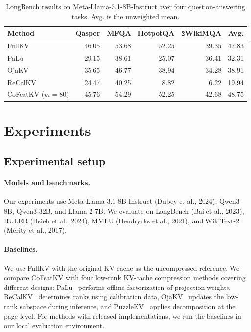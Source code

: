 \documentclass{article} %
\begin{document}
\begin{table}[H]
\centering
\caption{LongBench results on Meta-Llama-3.1-8B-Instruct over four question-answering
tasks. Avg. is the unweighted mean. }
\label{tab:longbench-llama}
\small
\setlength{\tabcolsep}{3.5pt}
\begin{tabular}{lrrrrr}
\toprule
Method & Qasper & MFQA & HotpotQA & 2WikiMQA & Avg. \\
\midrule
FullKV & 46.05 & 53.68 & 52.25 & 39.35 & 47.83 \\
PaLu~\citep{palu} & 29.15 & 38.61 & 25.07 & 36.41 & 32.31 \\
OjaKV~\citep{ojakv} & 35.65 & 46.77 & 38.94 & 34.28 & 38.91 \\
ReCalKV~\citep{recalkv} & 24.47 & 40.25 & 8.82 & 6.22 & 19.94 \\
CoFeatKV ($m=80$) &45.76 & 54.29 & 52.25 & 42.68 & 48.75 \\
\bottomrule
\end{tabular}
\end{table}
\section{Experiments}
\label{sec:experiments}

\subsection{Experimental setup}

\paragraph{Models and benchmarks.}
Our experiments use Meta-Llama-3.1-8B-Instruct (Dubey et al., 2024),
Qwen3-8B, Qwen3-32B, and Llama-2-7B. We evaluate on LongBench
(Bai et al., 2023), RULER (Hsieh et al., 2024), MMLU (Hendrycks et al.,
2021), and WikiText-2 (Merity et al., 2017).

\paragraph{Baselines.}
We use FullKV with the original KV cache as the uncompressed reference.
We compare CoFeatKV with four low-rank KV-cache compression methods covering
different designs: PaLu~\citep{palu} performs offline factorization
of projection weights, ReCalKV~\citep{recalkv} determines ranks using
calibration data, OjaKV~\citep{ojakv} updates the low-rank subspace
during inference, and PuzzleKV~\citep{puzzlekv} applies decomposition
at the page level. For methods with released implementations, we run the
baselines in our local evaluation environment.
\end{document}
